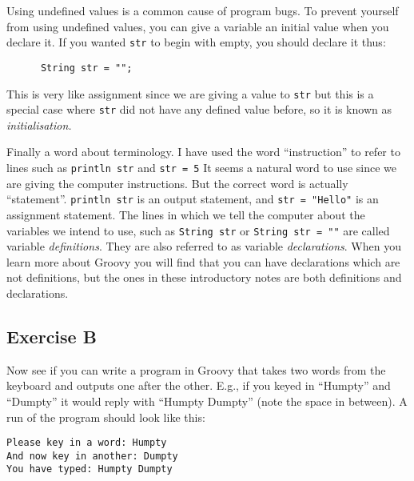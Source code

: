 Using undefined values is a common cause of program
bugs.  %
%
To prevent yourself from using undefined values, you can give a variable
an initial value when you declare it.  If you wanted \verb!str! to begin
with empty, you should declare it thus:

\begin{Verbatim}
      String str = "";
\end{Verbatim}

This is very like assignment since we are giving a value to \verb!str! but
this is a special case where \verb!str! did not have any defined value before,
so it is known as \emph{initialisation.}

Finally a word about terminology.  I have used the word ``instruction''
to refer to lines such as \verb!println str! and \verb!str = 5!
It seems a natural word to use since we are giving the computer instructions.
But the correct word is actually ``statement''.  \verb!println str! is
an output statement, and \verb!str = "Hello"! is an assignment statement.
The lines in which we tell the computer about the variables we intend to
use, such as \verb!String str! or \verb!String str = ""! are called
variable \emph{definitions}.  They are also referred to as 
variable \emph{declarations}.  When you learn more about Groovy you will
find that you can have declarations which are not definitions, but the
ones in these introductory notes are both definitions and declarations.

\subsection*{Exercise B}

Now see if you can write a program in Groovy that takes
two words from the keyboard and outputs one after the other. E.g., if
you keyed in ``Humpty'' and ``Dumpty'' 
it would reply with ``Humpty Dumpty'' (note the space in between).
A run of the program should look like this:
\begin{Verbatim}
Please key in a word: Humpty
And now key in another: Dumpty
You have typed: Humpty Dumpty
\end{Verbatim}


 	

